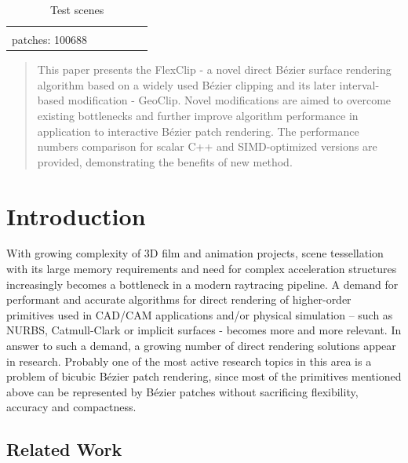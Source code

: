 \documentclass{jcgt}
\begin{document}
{\begin{table}[h!]
{\begin{tabular}{ *{6}{c} }
\begin{minipage}{.15\textwidth}
			\textbf{Zero} \\ patches: 100688
		\end{minipage}
	\end{tabular}}
	\caption{Test scenes}\label{tbl:test_scenes}
\end{table}
}

\maketitle
\thispagestyle{firstpagestyle}

\begin{abstract}
\small
This paper presents the FlexClip - a novel direct Bézier surface rendering algorithm based on a widely used Bézier clipping and its later interval-based modification - GeoClip. Novel modifications are aimed to overcome existing bottlenecks and further improve algorithm performance in application to  interactive Bézier patch rendering. The performance numbers comparison for scalar C++ and SIMD-optimized versions are provided, demonstrating the benefits of new method.
\end{abstract}


\section{Introduction}
\label{sec:introduction}
With growing complexity of 3D film and animation projects, scene tessellation with its large memory requirements and need for complex acceleration structures increasingly becomes a bottleneck in a modern raytracing pipeline. A demand for performant and accurate algorithms for direct rendering of higher-order primitives used in CAD/CAM applications and/or physical simulation – such as NURBS, Catmull-Clark or implicit surfaces - becomes more and more relevant. In answer to such a demand, a growing number of direct rendering solutions appear in research. Probably one of the most active research topics in this area is a problem of bicubic Bézier patch rendering, since most of the primitives mentioned above can be represented by Bézier patches without sacrificing flexibility, accuracy and compactness.

\subsection{Related Work}
\label{sec:relatedwork}
\end{document}
